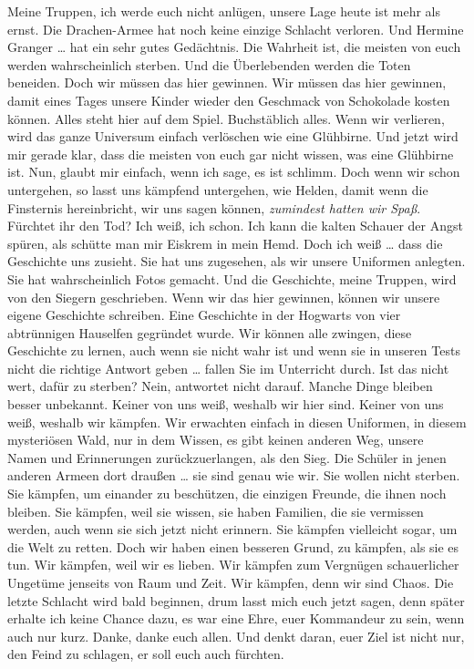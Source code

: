 Meine Truppen, ich werde euch nicht anlügen, unsere Lage heute ist mehr als ernst. Die Drachen-Armee hat noch keine einzige Schlacht verloren. Und Hermine Granger … hat ein sehr gutes Gedächtnis. Die Wahrheit ist, die meisten von euch werden wahrscheinlich sterben. Und die Überlebenden werden die Toten beneiden. Doch wir müssen das hier gewinnen. Wir müssen das hier gewinnen, damit eines Tages unsere Kinder wieder den Geschmack von Schokolade kosten können. Alles steht hier auf dem Spiel. Buchstäblich alles. Wenn wir verlieren, wird das ganze Universum einfach verlöschen wie eine Glühbirne. Und jetzt wird mir gerade klar, dass die meisten von euch gar nicht wissen, was eine Glühbirne ist. Nun, glaubt mir einfach, wenn ich sage, es ist schlimm. Doch wenn wir schon untergehen, so lasst uns kämpfend untergehen, wie Helden, damit wenn die Finsternis hereinbricht, wir uns sagen können, \emph{zumindest hatten wir Spaß}. Fürchtet ihr den Tod? Ich weiß, ich schon. Ich kann die kalten Schauer der Angst spüren, als schütte man mir Eiskrem in mein Hemd. Doch ich weiß … dass die Geschichte uns zusieht. Sie hat uns zugesehen, als wir unsere Uniformen anlegten. Sie hat wahrscheinlich Fotos gemacht. Und die Geschichte, meine Truppen, wird von den Siegern geschrieben. Wenn wir das hier gewinnen, können wir unsere eigene Geschichte schreiben. Eine Geschichte in der Hogwarts von vier abtrünnigen Hauselfen gegründet wurde. Wir können alle zwingen, diese Geschichte zu lernen, auch wenn sie nicht wahr ist und wenn sie in unseren Tests nicht die richtige Antwort geben … fallen Sie im Unterricht durch. Ist das nicht wert, dafür zu sterben? Nein, antwortet nicht darauf. Manche Dinge bleiben besser unbekannt. Keiner von uns weiß, weshalb wir hier sind. Keiner von uns weiß, weshalb wir kämpfen. Wir erwachten einfach in diesen Uniformen, in diesem mysteriösen Wald, nur in dem Wissen, es gibt keinen anderen Weg, unsere Namen und Erinnerungen zurückzuerlangen, als den Sieg. Die Schüler in jenen anderen Armeen dort draußen … sie sind genau wie wir. Sie wollen nicht sterben. Sie kämpfen, um einander zu beschützen, die einzigen Freunde, die ihnen noch bleiben. Sie kämpfen, weil sie wissen, sie haben Familien, die sie vermissen werden, auch wenn sie sich jetzt nicht erinnern. Sie kämpfen vielleicht sogar, um die Welt zu retten. Doch wir haben einen besseren Grund, zu kämpfen, als sie es tun. Wir kämpfen, weil wir es lieben. Wir kämpfen zum Vergnügen schauerlicher Ungetüme jenseits von Raum und Zeit. Wir kämpfen, denn wir sind Chaos. Die letzte Schlacht wird bald beginnen, drum lasst mich euch jetzt sagen, denn später erhalte ich keine Chance dazu, es war eine Ehre, euer Kommandeur zu sein, wenn auch nur kurz. Danke, danke euch allen. Und denkt daran, euer Ziel ist nicht nur, den Feind zu schlagen, er soll euch auch fürchten.

